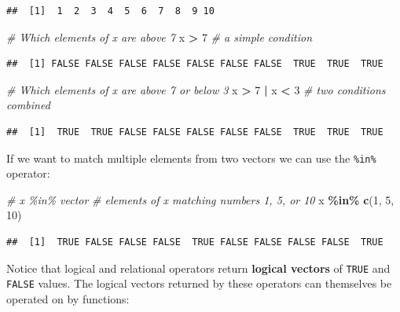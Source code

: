 \documentclass[
]{book}
\newenvironment{Shaded}{\begin{snugshade}}{\end{snugshade}}
\newcommand{\CommentTok}[1]{\textcolor[rgb]{0.56,0.35,0.01}{\textit{#1}}}
\newcommand{\DecValTok}[1]{\textcolor[rgb]{0.00,0.00,0.81}{#1}}
\newcommand{\KeywordTok}[1]{\textcolor[rgb]{0.13,0.29,0.53}{\textbf{#1}}}
\newcommand{\NormalTok}[1]{#1}
\newcommand{\OperatorTok}[1]{\textcolor[rgb]{0.81,0.36,0.00}{\textbf{#1}}}
\newcommand{\StringTok}[1]{\textcolor[rgb]{0.31,0.60,0.02}{#1}}
\begin{document}
\begin{verbatim}
##  [1]  1  2  3  4  5  6  7  8  9 10
\end{verbatim}

\begin{Shaded}
\begin{Highlighting}[]
\CommentTok{\# Which elements of x are above 7}
\NormalTok{x }\OperatorTok{\textgreater{}}\StringTok{ }\DecValTok{7} \CommentTok{\# a simple condition}
\end{Highlighting}
\end{Shaded}

\begin{verbatim}
##  [1] FALSE FALSE FALSE FALSE FALSE FALSE FALSE  TRUE  TRUE  TRUE
\end{verbatim}

\begin{Shaded}
\begin{Highlighting}[]
\CommentTok{\# Which elements of x are above 7 or below 3}
\NormalTok{x }\OperatorTok{\textgreater{}}\StringTok{ }\DecValTok{7} \OperatorTok{|}\StringTok{ }\NormalTok{x }\OperatorTok{\textless{}}\StringTok{ }\DecValTok{3} \CommentTok{\# two conditions combined}
\end{Highlighting}
\end{Shaded}

\begin{verbatim}
##  [1]  TRUE  TRUE FALSE FALSE FALSE FALSE FALSE  TRUE  TRUE  TRUE
\end{verbatim}

If we want to match multiple elements from two vectors we can use the \texttt{\%in\%} operator:

\begin{Shaded}
\begin{Highlighting}[]
\CommentTok{\# x \%in\% vector}
\CommentTok{\# elements of x matching numbers 1, 5, or 10 }
\NormalTok{x }\OperatorTok{\%in\%}\StringTok{ }\KeywordTok{c}\NormalTok{(}\DecValTok{1}\NormalTok{, }\DecValTok{5}\NormalTok{, }\DecValTok{10}\NormalTok{) }
\end{Highlighting}
\end{Shaded}

\begin{verbatim}
##  [1]  TRUE FALSE FALSE FALSE  TRUE FALSE FALSE FALSE FALSE  TRUE
\end{verbatim}

Notice that logical and relational operators return \textbf{logical vectors} of \texttt{TRUE} and \texttt{FALSE} values.
The logical vectors returned by these operators can themselves be operated on by functions:
\end{document}
